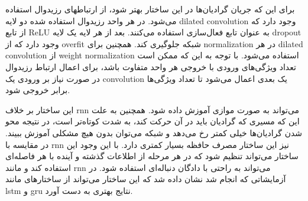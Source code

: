 برای این که جریان گرادیان‌ها در این ساختار بهتر شود، از ارتباطهای رزیدوال
استفاده می‌شود. در هر واحد رزیدوال استفاده شده دو لایه \gls{dilated convolution}
وجود دارد که از تابع ReLU به عنوان تابع فعال‌سازی استفاده می‌کنند. بعد از هر
لایه یک لایه dropout وجود دارد که از \gls{overfit} شبکه جلوگیری کند. همچنین برای
\gls{normalization} در هر \gls{dilated convolution} از \gls{weight
normalization} استفاده می‌شود. با توجه به این که ممکن است تعداد ویژگی‌های ورودی
با خروجی هر واحد متفاوت باشد، برای اعمال ارتباط رزیدوال در صورت نیاز بر ورودی یک
\gls{convolution} یک بعدی اعمال می‌شود تا تعداد ویژگی‌ها برابر خروجی شود.

این ساختار بر خلاف \gls{rnn} می‌تواند به صورت موازی آموزش داده شود. همچنین به
علت این که مسیری که گرادیان باید در آن حرکت کند، به شدت کوتاه‌تر است، در نتیجه
محو شدن گرادیان‌ها خیلی کمتر رخ می‌دهد و شبکه می‌توان بدون هیچ مشکلی آموزش
ببیند. در مقایسه با \gls{rnn} نیز این ساختار مصرف حافظه بسیار کمتری دارد. با این
وجود این ساختار می‌تواند تنظیم شود که در هر مرحله از اطلاعات گذشته و آینده با هر
فاصله‌ای استفاده کند و مانند \gls{rnn} می‌تواند به راحتی با دادگان دنباله‌ای
استفاده شود. در آزمایشاتی که انجام شد \cite{bai2018empirical} نشان داده شد که
این ساختار می‌تواند از ساختارهای مانند \gls{lstm} و \gls{gru} نتایج بهتری به دست
آورد.